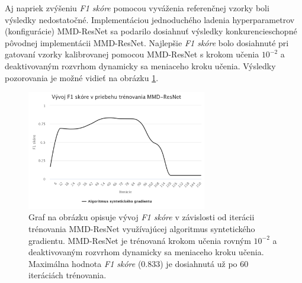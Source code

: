 Aj napriek zvýšeniu \textit{F1 skóre} pomocou vyváženia referenčnej vzorky boli výsledky nedostatočné. Implementáciou jednoduchého ladenia hyperparametrov (konfigurácie) MMD-ResNet sa podarilo dosiahnuť výsledky konkurencieschopné pôvodnej implementácii MMD-ResNet. Najlepšie \textit{F1 skóre} bolo dosiahnuté pri gatovaní vzorky kalibrovanej pomocou MMD-ResNet s krokom učenia $10^{-2}$ a deaktivovaným rozvrhom dynamicky sa meniaceho kroku učenia. Výsledky pozorovania je možné vidieť na obrázku \ref{vysledok7}.

\begin{figure}
\centerline{\includegraphics[width=0.7\textwidth]{images/experimenty/experiment7.png}}
\caption[Vývoj \textit{F1 skóre} v priebehu trénovania MMD-ResNet]{Graf na obrázku opisuje vývoj \textit{F1 skóre} v závislosti od iterácii trénovania MMD-ResNet využívajúcej algoritmus syntetického gradientu. MMD-ResNet je trénovaná krokom učenia rovným $10^{-2}$ a deaktivovaným rozvrhom dynamicky sa meniaceho kroku učenia. Maximálna hodnota \textit{F1 skóre} (0.833) je dosiahnutá už po 60 iteráciách trénovania.}
\label{vysledok7}
\end{figure}